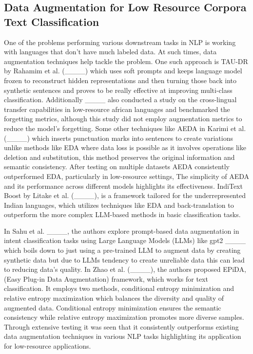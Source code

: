 \subsection{Data Augmentation for Low Resource Corpora Text Classification}
One of the problems performing various downstream tasks in NLP is working with languages that don't have much labeled data. At such times, data augmentation techniques help tackle the problem. One such approach is TAU-DR by Rahamim
et al. (____) which uses soft prompts and keeps language model frozen to reconstruct hidden representations and then turning those back into synthetic sentences and proves to be really effective at improving multi-class classification. Additionally ____ also conducted a study on the cross-lingual transfer capabilities in low-resource african languages and benchmarked the forgetting metrics, although this study did not employ augmentation metrics to reduce the model's forgetting.
Some other techniques like AEDA in Karimi et al. (____) which inserts punctuation marks into sentences to create variations unlike methods like EDA where data loss is possible as it involves operations like deletion and substitution, this method preserves the original information and semantic consistency. After testing on multiple datasets AEDA consistently outperformed EDA, particularly in low-resource settings, The simplicity of AEDA and its performance across different models highlights its effectiveness. IndiText Boost by Litake et al. (____), is a framework tailored for the underrepresented Indian languages, which utilizes techniques like EDA and back-translation to outperform the more complex LLM-based methods in basic classification tasks.
 
 In Sahu et al. ____, the authors explore prompt-based data augmentation in intent classification tasks using Large Language Models (LLMs) like gpt2 ____ which boils down to just using a pre-trained LLM to augment data by creating synthetic data but due to LLMs tendency to create unreliable data this can lead to reducing data's quality. In Zhao et al. (____), the authors proposed EPiDA, (Easy Plug-in Data Augmentation) framework, which works for text classification. It employs two methods, conditional entropy minimization and relative entropy maximization which balances the diversity and quality of augmented data. Conditional entropy minimization ensures the semantic consistency while relative entropy maximization promotes more diverse samples. Through extensive testing it was seen that it consistently outperforms existing data augmentation techniques in various NLP tasks highlighting its application for low-resource applications. 
\\
